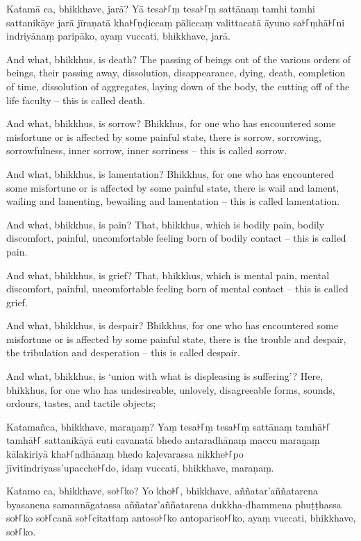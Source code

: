 Katamā ca, bhikkhave, jarā? Yā tesa꜔꜒ṃ tesa꜔꜒ṃ sattānaṃ tamhi tamhi sattanikāye jarā
jīraṇatā kha꜔꜒ṇḍiccaṃ pāliccaṃ valittacatā āyuno sa꜔꜒ṃhā꜔꜒ni indriyānaṃ paripāko, ayaṃ
vuccati, bhikkhave, jarā.

\englishPage

And what, bhikkhus, is death? The passing of beings out of the various orders of
beings, their passing away, dissolution, disappearance, dying, death, completion
of time, dissolution of aggregates, laying down of the body, the cutting off of
the life faculty -- this is called death.

And what, bhikkhus, is sorrow? Bhikkhus, for one who has encountered some
misfortune or is affected by some painful state, there is sorrow, sorrowing,
sorrowfulness, inner sorrow, inner sorriness -- this is called sorrow.

And what, bhikkhus, is lamentation? Bhikkhus, for one who has encountered some
misfortune or is affected by some painful state, there is wail and lament,
wailing and lamenting, bewailing and lamentation -- this is called lamentation.

And what, bhikkhus, is pain? That, bhikkhus, which is bodily pain, bodily
discomfort, painful, uncomfortable feeling born of bodily contact -- this is
called pain.

And what, bhikkhus, is grief? That, bhikkhus, which is mental pain, mental
discomfort, painful, uncomfortable feeling born of mental contact -- this is
called grief.

And what, bhikkhus, is despair? Bhikkhus, for one who has encountered some
misfortune or is affected by some painful state, there is the trouble and
despair, the tribulation and desperation -- this is called despair.

And what, bhikkhus, is `union with what is displeasing is suffering'? Here,
bhikkhus, for one who has undesireable, unlovely, disagreeable forms, sounds,
ordours, tastes, and tactile objects;

\paliPage

Katamañca, bhikkhave, maraṇaṃ? Yaṃ tesa꜔꜒ṃ tesa꜔꜒ṃ sattānaṃ tamhā꜔꜒ tamhā꜔꜒ sattanikāyā
cuti cavanatā bhedo antaradhānaṃ maccu maraṇaṃ kālakiriyā kha꜔꜒ndhānaṃ bhedo
kaḷevarassa nikkhe꜔꜒po jīvitindriyass'upacche꜔꜒do, idaṃ vuccati, bhikkhave, maraṇaṃ.

Katamo ca, bhikkhave, so꜔꜒ko? Yo kho꜔꜒, bhikkhave, aññatar'aññatarena byasanena
samannāgatassa aññatar'aññatarena dukkha-dhammena phuṭṭhassa so꜔꜒ko so꜔꜒canā
so꜔꜒citattaṃ antoso꜔꜒ko antopariso꜔꜒ko, ayaṃ vuccati, bhikkhave, so꜔꜒ko.

